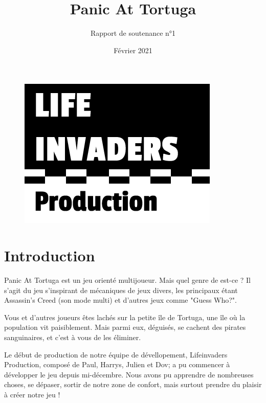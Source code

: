 \documentclass[french, 12pt]{article}
\title{\fontfamily{phv}\selectfont \Huge \textbf{Panic At Tortuga}}
\author{\fontfamily{phv}\Huge{Rapport de soutenance n°1}}
\date{\fontfamily{phv}\selectfont Février 2021}
\begin{document}
\begin{titlepage}
    \maketitle
    
    \thispagestyle{empty}
    \vspace{20pt}
    \begin{figure}[hbt!]
        \centering
        \includegraphics[scale=0.7]{logo_lifeinvaders_copie.png}
    \end{figure}
\end{titlepage}



\tableofcontents
\newpage

\pagestyle{fancy}

\section{Introduction}

Panic At Tortuga est un jeu orienté multijoueur. Mais quel genre de est-ce ?
Il s'agit du jeu s'inspirant de mécaniques de jeux divers, 
les principaux étant Assassin's Creed (son mode multi) et d'autres jeux comme "Guess Who?".

Vous et d'autres joueurs êtes lachés sur la petite île de Tortuga, une île où la population vit paisiblement.
Mais parmi eux, déguisés, se cachent des pirates sanguinaires, et c'est à vous de les éliminer.

Le début de production de notre équipe de dévellopement, Lifeinvaders Production,
composé de Paul, Harrys, Julien et Dov; a pu commencer à développer le jeu depuis mi-décembre.
Nous avons pu apprendre de nombreuses choses, se dépaser, sortir de notre zone de confort, mais surtout prendre du plaisir à créer notre jeu !
\end{document}
